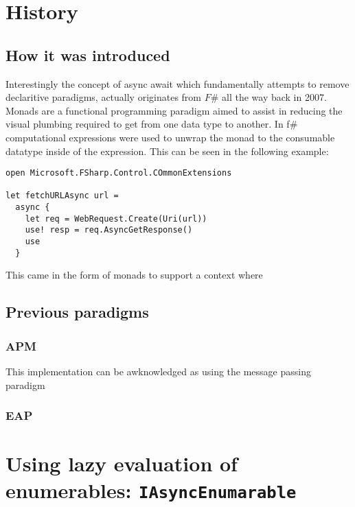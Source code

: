 \documentclass{article}
\begin{document}
\section{History}
\subsection{How it was introduced}
Interestingly the concept of async await which fundamentally attempts to remove declaritive paradigms,
actually originates from $F\#$ all the way back in 2007.\cite{fs_async}
Monads are a functional programming paradigm aimed to assist in reducing the visual plumbing required to 
get from one data type to another.
In f\# computational expressions were used to unwrap the monad to the consumable datatype inside of the expression. 
This can be seen in the following example:

\begin{lstlisting}[language={[Sharp]C}]
open Microsoft.FSharp.Control.COmmonExtensions

let fetchURLAsync url = 
  async {
    let req = WebRequest.Create(Uri(url))
    use! resp = req.AsyncGetResponse()
    use 
  }

\end{lstlisting}



This came in the form of monads to support a context where
\subsection{Previous paradigms}
\subsubsection{APM}
This implementation can be awknowledged as using the message passing paradigm
\subsubsection{EAP}

\section{Using lazy evaluation of enumerables: \texttt{IAsyncEnumarable}}
\end{document}
